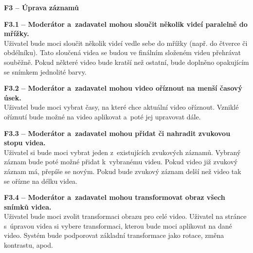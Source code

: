 \documentclass[thesis=M,czech]{FITthesis}[2012/06/26]
\begin{document}
\begin{description}
  \item \textbf{F3 -- Úprava záznamů}
  \begin{description}
    \item \textbf{F3.1 -- Moderátor a~zadavatel mohou sloučit několik videí paralelně do mřížky.\\}
	Uživatel bude moci sloučit několik videí vedle sebe do mřížky (např. do čtverce či obdélníku). Tato sloučená videa se budou ve finálním složeném videu přehrávat souběžně. Pokud některé video bude kratší než ostatní, bude doplněno opakujícím se snímkem jednolité barvy.
    \item \textbf{F3.2 -- Moderátor a~zadavatel mohou video oříznout na menší časový úsek.\\}
    Uživatel bude moci vybrat časy, na které chce aktuální video oříznout. Vzniklé oříznutí bude možné na video aplikovat a~poté jej upravovat dále.\pagebreak
    \item \textbf{F3.3 -- Moderátor a~zadavatel mohou přidat či nahradit zvukovou stopu videa.\\}
    Uživatel si bude moci vybrat jeden z~existujících zvukových záznamů. Vybraný záznam bude poté možné přidat k~vybranému videu. Pokud video již zvukový záznam má, přepíše se novým. Pokud bude zvukový záznam delší než video tak se ořízne na délku videa.
    \item \textbf{F3.4 -- Moderátor a~zadavatel mohou transformovat obraz všech snímků videa.\\}
	Uživatel bude moci zvolit transformaci obrazu pro celé video. Uživatel na stránce s~úpravou videa si vybere transformaci, kterou bude moci aplikovat na dané video. Systém  bude podporovat základní transformace jako rotace, změna kontrastu, apod.
  \end{description}
  

\end{description}
\end{document}
